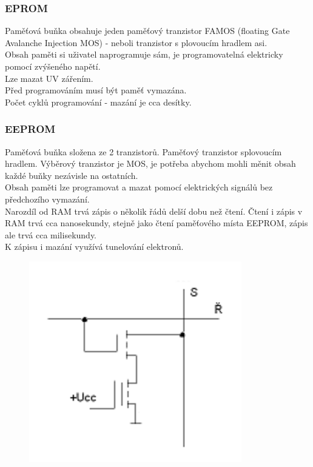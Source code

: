 \subsubsection*{EPROM}
Paměťová buňka obsahuje jeden paměťový tranzistor FAMOS (floating Gate Avalanche Injection MOS) - neboli tranzistor s plovoucím hradlem asi. \\
Obsah paměti si uživatel naprogramuje sám, je programovatelná elektricky pomocí zvýšeného napětí. \\
Lze mazat UV zářením. \\
Před programováním musí být paměť vymazána. \\
Počet cyklů programování - mazání je cca desítky. \\

\subsubsection*{EEPROM}
Paměťová buňka složena ze 2 tranzistorů. Paměťový tranzistor splovoucím hradlem. Výběrový tranzistor je MOS, je potřeba abychom mohli měnit obsah každé buňky nezávisle na ostatních. \\
Obsah paměti lze programovat a mazat pomocí elektrických
signálů bez předchozího vymazání. \\
Narozdíl od RAM trvá zápis o několik řádů delší dobu než čtení.     Čtení i zápis v RAM trvá cca nanosekundy, stejně jako čtení paměťového místa EEPROM, zápis ale trvá cca milisekundy. \\
K zápisu i mazání využívá tunelování elektronů. \\
\begin{figure}[h!]
    \centering
    \includegraphics[scale = 0.5]{img/EEPROM.png}
\end{figure}

